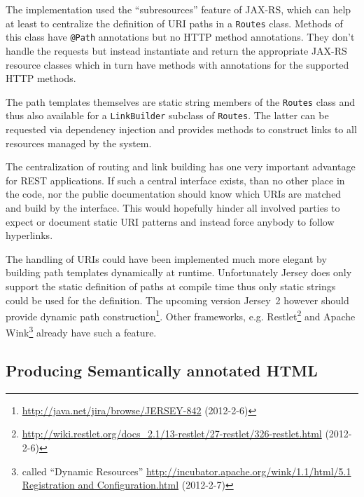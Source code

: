 \documentclass[11pt,a4paper,headsepline,twoside]{scrartcl}		%
\newcommand{\citeurl}[2]{\url{#1} (#2)}
\begin{document}
The implementation used the ``subresources'' feature of JAX-RS, which can help
at least to centralize the definition of URI paths in a \lstinline:Routes:
class. Methods of this class have \lstinline:@Path: annotations but no HTTP
method annotations. They don't handle the requests but instead instantiate and
return the appropriate JAX-RS resource classes which in turn have methods with
annotations for the supported HTTP methods.

The path templates themselves are static string members of the
\lstinline:Routes: class and thus also available for a \lstinline:LinkBuilder:
subclass of \lstinline:Routes:. The latter can be requested via dependency
injection and provides methods to construct links to all resources managed by
the system.

The centralization of routing and link building has one very important advantage
for REST applications. If such a central interface exists, than no other place
in the code, nor the public documentation should know which URIs are matched and
build by the interface. This would hopefully hinder all involved parties to
expect or document static URI patterns and instead force anybody to follow
hyperlinks.

The handling of URIs could have been implemented much more elegant by building
path templates dynamically at runtime. Unfortunately Jersey does only support
the static definition of paths at compile time thus only static strings could be
used for the definition. The upcoming version Jersey~2 however should provide
dynamic path
construction\footnote{\citeurl{http://java.net/jira/browse/JERSEY-842}{2012-2-6}}. Other frameworks, e.g.
Restlet\footnote{\citeurl{http://wiki.restlet.org/docs_2.1/13-restlet/27-restlet/326-restlet.html}{2012-2-6}} and
Apache Wink\footnote{called ``Dynamic Resources''
  \citeurl{http://incubator.apache.org/wink/1.1/html/5.1 Registration and Configuration.html}{2012-2-7}}
already have such a feature.

\subsection{Producing Semantically annotated HTML}
\label{sec:prod-semant-annot}


\end{document}
